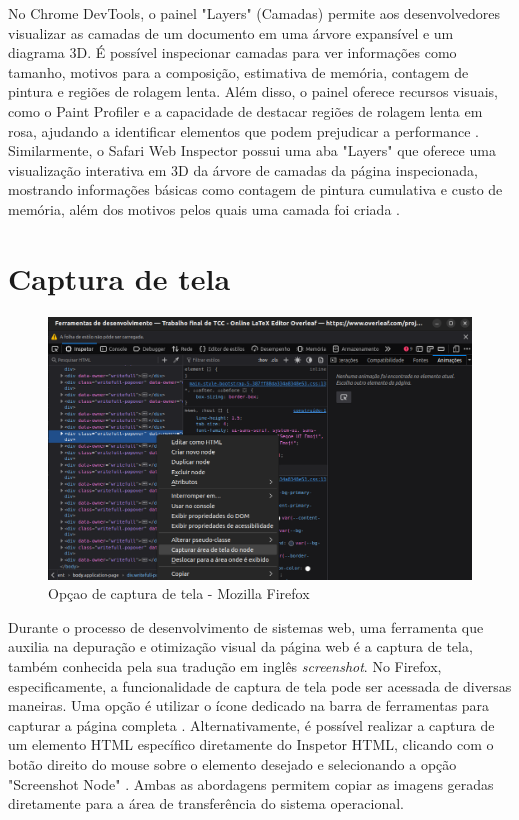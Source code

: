 No Chrome DevTools, o painel "Layers" (Camadas) permite aos desenvolvedores visualizar as camadas de um documento em uma árvore expansível e um diagrama 3D. É possível inspecionar camadas para ver informações como tamanho, motivos para a composição, estimativa de memória, contagem de pintura e regiões de rolagem lenta. Além disso, o painel oferece recursos visuais, como o Paint Profiler e a capacidade de destacar regiões de rolagem lenta em rosa, ajudando a identificar elementos que podem prejudicar a performance \cite{chrome}. Similarmente, o Safari Web Inspector possui uma aba "Layers" que oferece uma visualização interativa em 3D da árvore de camadas da página inspecionada, mostrando informações básicas como contagem de pintura cumulativa e custo de memória, além dos motivos pelos quais uma camada foi criada \cite{apple}.
\section{Captura de tela}
\begin{figure}[h!]
    \centering
    \includegraphics[width=0.7\linewidth]{assets/tools/firefox-screenshot.png}
    \caption{Opçao de captura de tela - Mozilla Firefox }
    \label{fig:enter-label}
\end{figure}
Durante o processo de desenvolvimento de sistemas web, uma ferramenta que auxilia na depuração e otimização visual da página web é a captura de tela, também conhecida pela sua tradução em inglês \textit{screenshot}. No Firefox, especificamente, a funcionalidade de captura de tela pode ser acessada de diversas maneiras. Uma opção é utilizar o ícone dedicado na barra de ferramentas para capturar a página completa \cite{firefox}. Alternativamente, é possível realizar a captura de um elemento HTML específico diretamente do Inspetor HTML, clicando com o botão direito do mouse sobre o elemento desejado e selecionando a opção "Screenshot Node" \cite{firefox}. Ambas as abordagens permitem copiar as imagens geradas diretamente para a área de transferência do sistema operacional.

